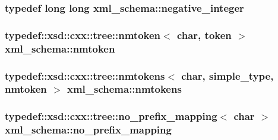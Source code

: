 \subsubsection[{\texorpdfstring{negative\+\_\+integer}{negative_integer}}]{\setlength{\rightskip}{0pt plus 5cm}typedef long long {\bf xml\+\_\+schema\+::negative\+\_\+integer}}\hypertarget{namespacexml__schema_acf9528a84381d07f2802785c947bf441}{}\label{namespacexml__schema_acf9528a84381d07f2802785c947bf441}
\subsubsection[{\texorpdfstring{nmtoken}{nmtoken}}]{\setlength{\rightskip}{0pt plus 5cm}typedef\+::xsd\+::cxx\+::tree\+::nmtoken$<$ char, {\bf token} $>$ {\bf xml\+\_\+schema\+::nmtoken}}\hypertarget{namespacexml__schema_af60189e21a69b126898eb625992ff730}{}\label{namespacexml__schema_af60189e21a69b126898eb625992ff730}
\subsubsection[{\texorpdfstring{nmtokens}{nmtokens}}]{\setlength{\rightskip}{0pt plus 5cm}typedef\+::xsd\+::cxx\+::tree\+::nmtokens$<$ char, {\bf simple\+\_\+type}, {\bf nmtoken} $>$ {\bf xml\+\_\+schema\+::nmtokens}}\hypertarget{namespacexml__schema_ab2ece9a172d690c8276a27fa696a3b43}{}\label{namespacexml__schema_ab2ece9a172d690c8276a27fa696a3b43}
\subsubsection[{\texorpdfstring{no\+\_\+prefix\+\_\+mapping}{no_prefix_mapping}}]{\setlength{\rightskip}{0pt plus 5cm}typedef\+::xsd\+::cxx\+::tree\+::no\+\_\+prefix\+\_\+mapping$<$ char $>$ {\bf xml\+\_\+schema\+::no\+\_\+prefix\+\_\+mapping}}\hypertarget{namespacexml__schema_a103914036487a85ba84743f0e65b1d96}{}\label{namespacexml__schema_a103914036487a85ba84743f0e65b1d96}

